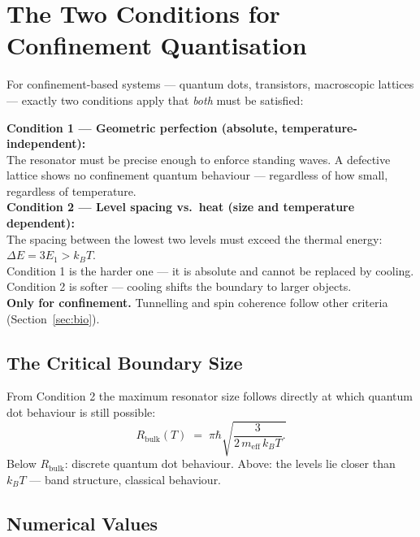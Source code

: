 \section{The Two Conditions for Confinement Quantisation}
\label{sec:two-conditions}

For confinement-based systems --- quantum dots, transistors,
macroscopic lattices --- exactly two conditions apply
that \emph{both} must be satisfied:

\begin{important}
\textbf{Condition 1 --- Geometric perfection (absolute, temperature-independent):}\\
The resonator must be precise enough to enforce standing waves.
A defective lattice shows no confinement quantum behaviour ---
regardless of how small, regardless of temperature.\\[6pt]
\textbf{Condition 2 --- Level spacing vs.\ heat (size and temperature dependent):}\\
The spacing between the lowest two levels must exceed the
thermal energy: $\Delta E = 3E_1 > k_BT$.\\[6pt]
Condition 1 is the harder one --- it is absolute and cannot be
replaced by cooling. Condition 2 is softer ---
cooling shifts the boundary to larger objects.\\[4pt]
\textbf{Only for confinement.} Tunnelling and spin coherence
follow other criteria (Section~\ref{sec:bio}).
\end{important}

\subsection{The Critical Boundary Size}

From Condition 2 the maximum resonator size follows directly
at which quantum dot behaviour is still possible:
\begin{equation}
  \boxed{R_{\text{bulk}}(T) \;=\;
  \pi\hbar\sqrt{\frac{3}{2\,m_{\text{eff}}\,k_BT}.}}
\end{equation}
Below $R_{\text{bulk}}$: discrete quantum dot behaviour.
Above: the levels lie closer than $k_BT$ ---
band structure, classical behaviour.

\subsection{Numerical Values}

